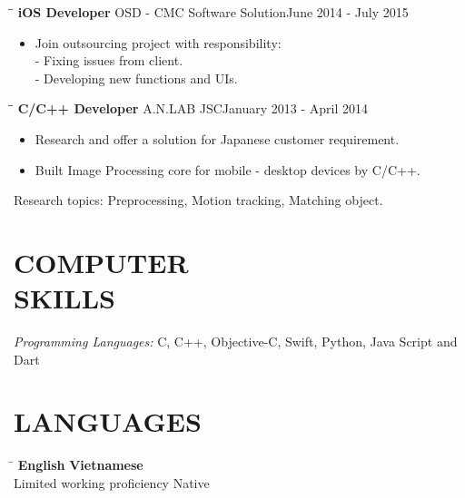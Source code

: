 \documentclass[margin, 10pt]{res}
\begin{document}
\begin{resume}
   \begin{tabbing}
   \hspace{2.0in}\= \hspace{2.0in}\= \kill %
   {\bf iOS Developer} \>OSD - CMC  Software Solution\>June 2014 - July 2015\\
   \end{tabbing}\vspace{-20pt} %

   \begin{itemize}
   		\item Join outsourcing project with responsibility: \\ - Fixing issues from client. \\ - Developing new functions and UIs. 
		
   \end{itemize}

   \begin{tabbing}
   \hspace{2.0in}\= \hspace{2.0in}\= \kill %
   {\bf C/C++ Developer} \>A.N.LAB JSC\>January 2013 - April 2014\\
   \end{tabbing}\vspace{-20pt} %

   \begin{itemize}
   		\item Research and offer a solution for Japanese customer requirement. 
		\item Built Image Processing core for mobile - desktop devices by C/C++.		
		
   \end{itemize}
   Research topics: Preprocessing, Motion tracking, Matching object.
	
\section{COMPUTER \\ SKILLS}
   {\sl Programming Languages:} C, C++, Objective-C, Swift, Python, Java Script and Dart\\

\section{LANGUAGES}
	\vspace{-0.1in}
	\begin{tabbing}
    \hspace{2.8in}\= \kill %
    \textbf{English}            \> \textbf{Vietnamese}\\
    Limited working proficiency \> Native\\
	\end{tabbing}\vspace{-20pt}
	

\end{resume}
\end{document}

